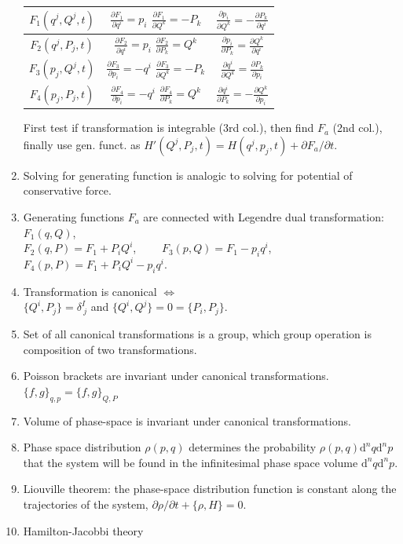 \documentclass{article}
\renewcommand\d{\mathrm d}
\begin{document}
\begin{multicols}{3}
\begin{enumerate}
\begin{tabular}{|c|c|c|}
                $F_1(q^j,Q^j,t)$ & $\frac{\partial F_1}{\partial q^i}=p_i$ $\frac{\partial F_1}{\partial Q^k}=-P_k$ & $\frac{\partial p_i}{\partial Q^k}=-\frac{\partial P_k}{\partial q^i}$ \rule{0pt}{3ex}\\\hline
                \rule{0pt}{3ex}
                $F_2(q^j,P_j,t)$ & $\frac{\partial F_2}{\partial q^i}=p_i$ $\frac{\partial F_2}{\partial P_k}=Q^k$ & $\frac{\partial p_i}{\partial P_k}=\frac{\partial Q^k}{\partial q^i}$ \rule{0pt}{3ex}\\\hline
                \rule{0pt}{3ex}
                $F_3(p_j,Q^j,t)$ & $\frac{\partial F_3}{\partial p_i}=-q^i$ $\frac{\partial F_3}{\partial Q^k}=-P_k$ & $\frac{\partial q^i}{\partial Q^k}=\frac{\partial P_k}{\partial p_i}$ \rule{0pt}{3ex}\\\hline
                \rule{0pt}{3ex}
                $F_4(p_j,P_j,t)$ & $\frac{\partial F_4}{\partial p_i}=-q^i$ $\frac{\partial F_4}{\partial P_k}=Q^k$ & $\frac{\partial q^i}{\partial P_k}=-\frac{\partial Q^k}{\partial p_i}$ \rule{0pt}{3ex}\\\hline
            \end{tabular}
            First test if transformation is integrable (3rd col.), then find $F_a$ (2nd col.), finally use gen. funct. as
            $H'(Q^j,P_j,t)=H(q^j,p_j,t)+\partial F_a/\partial t$.
            \item Solving for generating function is analogic to solving for potential of conservative force.
            \item Generating functions $F_a$ are connected with Legendre dual transformation:
            $F_1(q,Q)$,\\$F_2(q,P)=F_1+P_iQ^i$,~~~~ $F_3(p,Q)=F_1-p_iq^i$,\\$F_4(p,P)=F_1+P_iQ^i-p_iq^i$.
            \item Transformation is canonical $\Leftrightarrow$\\ $\{Q^i,P_j\}=\delta^I_{~j}$ and $\{Q^i,Q^j\}=0=\{P_i,P_j\}$.
            \item Set of all canonical transformations is a group, which group operation is composition of two transformations.
            \item Poisson brackets are invariant under canonical transformations. $\{f,g\}_{q,p}=\{f,g\}_{Q,P}$
            \item Volume of phase-space is invariant under canonical transformations.
            \item Phase space distribution $\rho(p,q)$ determines the probability $\rho(p,q)\d^nq\d^np$ that the system will be found in the infinitesimal phase space volume $\d^nq\d^np$.
            \item Liouville theorem: the phase-space distribution function is constant along the trajectories of the system, $\partial\rho/\partial t+\{\rho,H\}=0$.
            \item {\color{red} Hamilton-Jacobbi theory}
        \end{enumerate}


\end{multicols}
\end{document}

